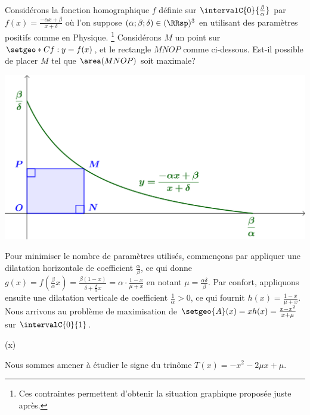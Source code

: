 Considérons la fonction homographique $f$ définie sur $\intervalC{0}{\frac{\beta}{\alpha}}$ par $f(x) = \frac{- \alpha x + \beta}{x + \delta}$ où l'on suppose $(\alpha ; \beta ; \delta) \in (\RRsp)^3$ en utilisant des paramètres positifs comme en Physique.%
\footnote{
	Ces contraintes permettent d'obtenir la situation graphique proposée juste après.
}
%
Considérons $M$ un point sur $\setgeo*{C}{f}: y = f(x)$, et le rectangle $MNOP$ comme ci-dessous. Est-il possible de placer $M$ tel que $\area(MNOP)$ soit maximale?

\smallskip

\begin{center}
	\includegraphics[scale=.67]{goal.png}
\end{center}




Pour minimiser le nombre de paramètres utilisés,
commençons par appliquer une dilatation horizontale de coefficient $\frac{\alpha}{\beta}$,
ce qui donne 
$g(x) = f( \frac{\beta}{\alpha} x ) 
      = \frac{\beta(1 - x)}{\delta + \frac{\beta}{\alpha} x}
      = \alpha \cdot \frac{1 - x}{\mu + x}$
en notant $\mu = \frac{\alpha \delta}{\beta}$.
Par confort,
appliquons ensuite une dilatation verticale de coefficient $\frac{1}{\alpha} > 0$,
ce qui fournit 
$h(x) = \frac{1 - x}{\mu + x}$.
%
Nous arrivons au problème de maximisation de
$\setgeo{A}(x) = x h(x) = \frac{x - x^2}{x + \mu}$
sur $\intervalC{0}{1}$.

\begin{stepcalc}[style=sar]
	(x)
\explnext{}
\explnext{}
\end{stepcalc}

\smallskip

Nous sommes amener à étudier le signe du trinôme
$T(x) = - x^2 - 2 \mu x + \mu$.

